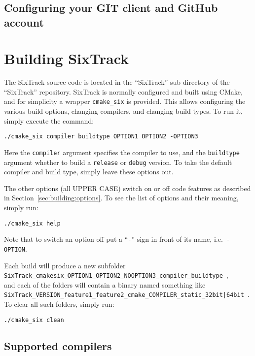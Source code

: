 \documentclass[english,BCOR=0mm,DIV=18]{scrartcl}
\begin{document}
\subsection{Configuring your GIT client and GitHub account}
\label{sec:contributing:git}


\section{Building SixTrack}
\label{sec:building}

The SixTrack source code is located in the ``SixTrack'' sub-directory of the ``SixTrack'' repository.
SixTrack is normally configured and built using CMake, and for simplicity a wrapper \texttt{cmake\_six} is provided.
This allows configuring the various build options, changing compilers, and changing build types.
To run it, simply execute the command:
\begin{lstlisting}
./cmake_six compiler buildtype OPTION1 OPTION2 -OPTION3
\end{lstlisting}
Here the \texttt{compiler} argument specifies the compiler to use, and the \texttt{buildtype} argument whether to build a \texttt{release} or \texttt{debug} version.
To take the default compiler and build type, simply leave these options out.

The other options (all UPPER CASE) switch on or off code features as described in Section~\ref{sec:building:options}.
To see the list of options and their meaning, simply run:
\begin{lstlisting}
./cmake_six help
\end{lstlisting}
Note that to switch an option off put a ``\texttt{-}'' sign in front of its name, i.e.\ \texttt{-OPTION}.

Each build will produce a new subfolder\\
\texttt{SixTrack\_\-cmakesix\_\-OPTION1\_\-OPTION2\_\-NOOPTION3\_\-compiler\_\-buildtype}~,\\
and each of the folders will contain a binary named something like\\
\texttt{SixTrack\_VERSION\_feature1\_feature2\_cmake\_COMPILER\_static\_{32bit|64bit}}~.\\
To clear all such folders, simply run:
\begin{lstlisting}
./cmake_six clean
\end{lstlisting}

\subsection{Supported compilers}
\label{sec:building:compilers}
\end{document}
